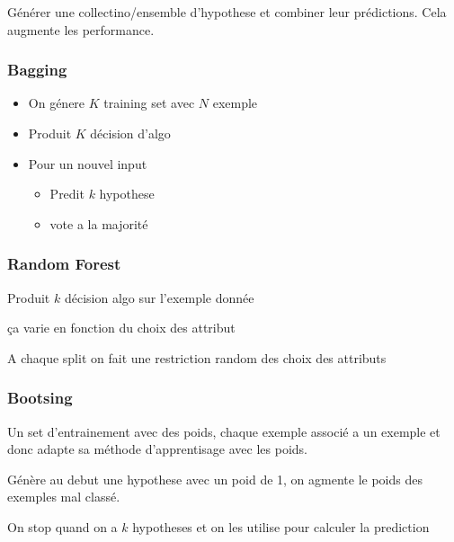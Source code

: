 \documentclass[12pt]{article}
\begin{document}
		Générer une collectino/ensemble d'hypothese et combiner leur prédictions. Cela augmente les performance.
		\subsubsection{Bagging}
			\begin{itemize}
				\item On génere $K$ training set avec $N$ exemple
				\item Produit $K$ décision d'algo
				\item Pour un nouvel input
				\begin{itemize}
					\item Predit $k$ hypothese
					\item vote a la majorité
				\end{itemize}
			\end{itemize}
			
		\subsubsection{Random Forest}
			Produit $k$ décision algo sur l'exemple donnée
			
			ça varie en fonction du choix des attribut
			
			A chaque split on fait une restriction random des choix des attributs
			
		\subsubsection{Bootsing}
			Un set d'entrainement avec des poids, chaque exemple associé a un exemple et donc adapte sa méthode d'apprentisage avec les poids.
			
			Génère au debut une hypothese avec un poid de 1, on agmente le poids des exemples mal classé. 
			
			On stop quand on a $k$ hypotheses et on les utilise pour calculer la prediction
\end{document}

